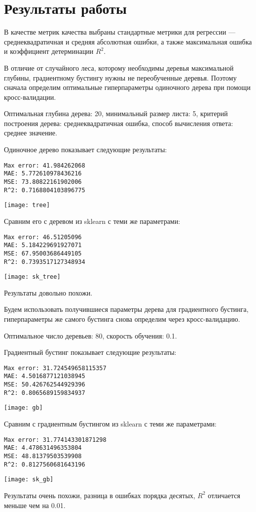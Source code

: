 \section{Результаты работы}
В качестве метрик качества выбраны стандартные метрики для регрессии --- среднеквадратичная и средняя абсолютная ошибки, а также максимальная ошибка и коэффициент детерминации $R^2$.

В отличие от случайного леса, которому необходимы деревья максимальной глубины, градиентному бустингу нужны не переобученные деревья. Поэтому сначала определим оптимальные гиперпараметры одиночного дерева при помощи кросс-валидации.

Оптимальная глубина дерева: 20, минимальный размер листа: 5, критерий построения дерева: среднеквадратичная ошибка, способ вычисления ответа: среднее значение.

Одиночное дерево показывает следующие результаты:
\begin{lstlisting}[frame=none, numbers=none]
Max error: 41.984262068
MAE: 5.772610978436216
MSE: 73.80822161902006
R^2: 0.7168804103896775
\end{lstlisting}
\texttt{[image: tree]}

\pagebreak
Сравним его с деревом из sklearn с теми же параметрами:
\begin{lstlisting}[frame=none, numbers=none]
Max error: 46.51205096
MAE: 5.184229691927071
MSE: 67.95003686449105
R^2: 0.7393517127348934
\end{lstlisting}
\texttt{[image: sk\_tree]}

Результаты довольно похожи.

Будем использовать получившиеся параметры дерева для градиентного бустинга, гиперпараметры же самого бустинга снова определим через кросс-валидацию.

Оптимальное число деревьев: 80, скорость обучения: 0.1.

Градиентный бустинг показывает следующие результаты:
\begin{lstlisting}[frame=none, numbers=none]
Max error: 31.724549658115357
MAE: 4.5016877121038945
MSE: 50.426762544929396
R^2: 0.8065689159834937
\end{lstlisting}
\texttt{[image: gb]}

\pagebreak
Сравним с градиентным бустингом из sklearn с теми же параметрами:
\begin{lstlisting}[frame=none, numbers=none]
Max error: 31.774143301871298
MAE: 4.478631496353804
MSE: 48.81379503539908
R^2: 0.8127560681643196
\end{lstlisting}
\texttt{[image: sk\_gb]}

Результаты очень похожи, разница в ошибках порядка десятых, $R^2$ отличается меньше чем на 0.01. 

\pagebreak

